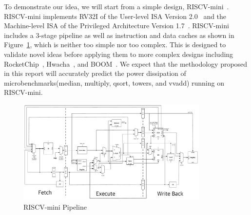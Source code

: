 To demonstrate our idea, we will start from a simple design, RISCV-mini~\cite{riscv-mini}.
RISCV-mini implements RV32I of the User-level ISA Version 2.0~\cite{riscv-user-2.0} and
the Machine-level ISA of the Privileged Architecture Version 1.7~\cite{riscv-prev-1.7}.
RISCV-mini includes a 3-stage pipeline as well as instruction and data caches as shown
in Figure~\ref{fig:riscv_mini}, which is neither too simple nor too complex. This is designed
to validate novel ideas before applying them to more complex designs including
RocketChip~\cite{RocketChip}, Hwacha~\cite{Hwacha}, and BOOM~\cite{BOOM}.
We expect that the methodology proposed in this report will accurately predict
the power dissipation of microbenchmarks(median, multiply, qsort, towers, and vvadd) running on RISCV-mini.

\begin{figure}
	\centering
	\includegraphics[width=0.85\textwidth,height=\textheight,keepaspectratio]{images/riscv_mini.pdf}
	\caption{RISCV-mini Pipeline}
	\label{fig:riscv_mini}
\end{figure}
